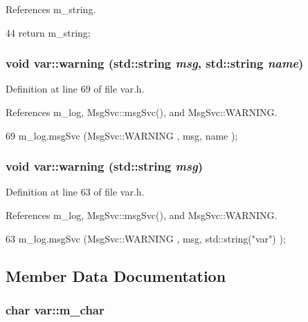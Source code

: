 References m\_\-string.


\begin{DoxyCode}
44 { return m_string; }
\end{DoxyCode}
\hypertarget{classvar_af8e180a414b085d50d35ba585bf7717f}{
\subsubsection[{warning}]{\setlength{\rightskip}{0pt plus 5cm}void var::warning (std::string {\em msg}, \/  std::string {\em name})}}
\label{classvar_af8e180a414b085d50d35ba585bf7717f}


Definition at line 69 of file var.h.

References m\_\-log, MsgSvc::msgSvc(), and MsgSvc::WARNING.


\begin{DoxyCode}
69 { m_log.msgSvc (MsgSvc::WARNING , msg, name ); }
\end{DoxyCode}
\hypertarget{classvar_a56b3d498264760e7b1212d204e6a49d4}{
\subsubsection[{warning}]{\setlength{\rightskip}{0pt plus 5cm}void var::warning (std::string {\em msg})}}
\label{classvar_a56b3d498264760e7b1212d204e6a49d4}


Definition at line 63 of file var.h.

References m\_\-log, MsgSvc::msgSvc(), and MsgSvc::WARNING.


\begin{DoxyCode}
63 { m_log.msgSvc (MsgSvc::WARNING , msg, std::string("var") ); }
\end{DoxyCode}


\subsection{Member Data Documentation}
\hypertarget{classvar_afffb29be23233ae232502023719da1d3}{
\subsubsection[{m\_\-char}]{\setlength{\rightskip}{0pt plus 5cm}char {\bf var::m\_\-char}}}
\label{classvar_afffb29be23233ae232502023719da1d3}


